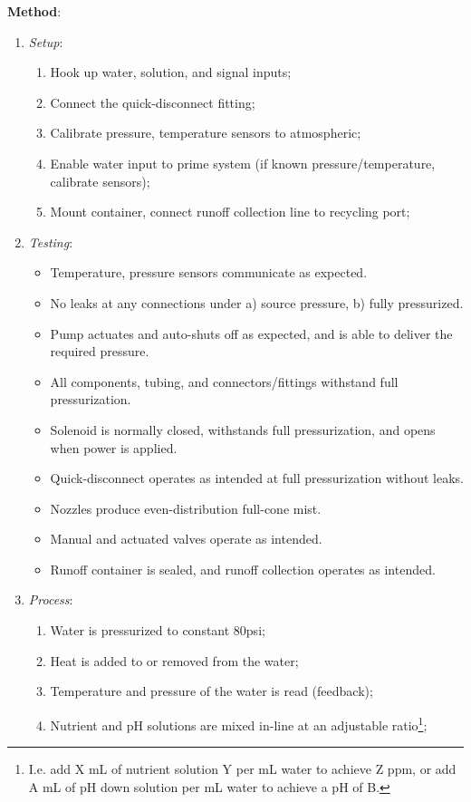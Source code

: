 \textbf{Method}:
\begin{enumerate}
    \item \textit{Setup}:
    \begin{enumerate}
        \item Hook up water, solution, and signal inputs;
        \item Connect the quick-disconnect fitting;
        \item Calibrate pressure, temperature sensors to atmospheric;
        \item Enable water input to prime system (if known pressure/temperature, calibrate sensors);
        \item Mount container, connect runoff collection line to recycling port;
    \end{enumerate}
    \item \textit{Testing}:
    \begin{itemize}
        \item Temperature, pressure sensors communicate as expected.
        \item No leaks at any connections under a) source pressure, b) fully pressurized.
        \item Pump actuates and auto-shuts off as expected, and is able to deliver the required pressure.
        \item All components, tubing, and connectors/fittings withstand full pressurization.
        \item Solenoid is normally closed, withstands full pressurization, and opens when power is applied.
        \item Quick-disconnect operates as intended at full pressurization without leaks.
        \item Nozzles produce even-distribution full-cone mist.
        \item Manual and actuated valves operate as intended.
        \item Runoff container is sealed, and runoff collection operates as intended.
    \end{itemize}
    \item \textit{Process}:
    \begin{enumerate}
        \item Water is pressurized to constant 80psi;
        \item Heat is added to or removed from the water;
        \item Temperature and pressure of the water is read (feedback);
        \item Nutrient and pH solutions are mixed in-line at an adjustable ratio\footnote{I.e. add X mL of nutrient solution Y per mL water to achieve Z ppm, or add A mL of pH down solution per mL water to achieve a pH of B.};

\end{enumerate}
\end{enumerate}
